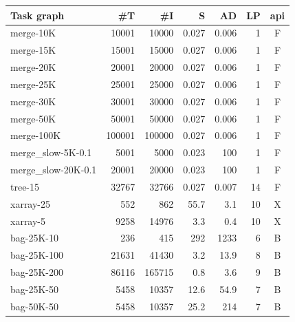 \setlength{\tabcolsep}{5pt}
\begin{table}[h]
	\centering
	\begin{tabular}{l|rrrrrc}
		\toprule
		\textbf{Task graph} & \textbf{\#T} & \textbf{\#I}       & \textbf{S} &
		\textbf{AD}         & \textbf{LP}  & \textbf{\gls{api}}                               \\
		\midrule
		merge-10K           & 10001        & 10000              & 0.027      & 0.006 & 1  & F \\
		merge-15K           & 15001        & 15000              & 0.027      & 0.006 & 1  & F \\
		merge-20K           & 20001        & 20000              & 0.027      & 0.006 & 1  & F \\
		merge-25K           & 25001        & 25000              & 0.027      & 0.006 & 1  & F \\
		merge-30K           & 30001        & 30000              & 0.027      & 0.006 & 1  & F \\
		merge-50K           & 50001        & 50000              & 0.027      & 0.006 & 1  & F \\
		merge-100K          & 100001       & 100000             & 0.027      & 0.006 & 1  & F \\
		merge\_slow-5K-0.1  & 5001         & 5000               & 0.023      & 100   & 1  & F \\
		merge\_slow-20K-0.1 & 20001        & 20000              & 0.023      & 100   & 1  & F \\
		tree-15             & 32767        & 32766              & 0.027      & 0.007 & 14 & F \\
		xarray-25           & 552          & 862                & 55.7       & 3.1   & 10 & X \\
		xarray-5            & 9258         & 14976              & 3.3        & 0.4   & 10 & X \\
		bag-25K-10          & 236          & 415                & 292        & 1233  & 6  & B \\
		bag-25K-100         & 21631        & 41430              & 3.2        & 13.9  & 8  & B \\
		bag-25K-200         & 86116        & 165715             & 0.8        & 3.6   & 9  & B \\
		bag-25K-50          & 5458         & 10357              & 12.6       & 54.9  & 7  & B \\
		bag-50K-50          & 5458         & 10357              & 25.2       & 214   & 7  & B \\

\end{tabular}
\end{table}
